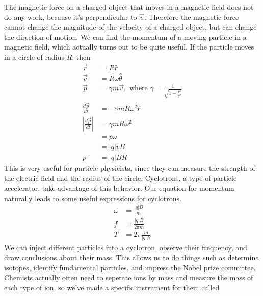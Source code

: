 \documentclass[nobib]{tufte-handout}
\begin{document}
The magnetic force on a charged object that moves in a
magnetic field does not do any work, because it's
perpendicular to $\vec{v}$.
Therefore the magnetic force cannot change the magnitude of the
velocity of a charged object, but can change the direction
of motion. 
We can find the momentum of a moving particle in a magnetic field, which actually turns 
out to be quite useful. If the particle moves in a circle of radius $R$, then 
\begin{align*}
    \vec{r} &= R\hat{r} \\
    \vec{v} &= R\omega\hat{\theta} \\
    \vec{p} &= \gamma m \vec{v}, \text{ where } \gamma = \frac{1}{\sqrt{1-\frac{v^2}{c^2}}} \\
    \frac{d\vec{p}}{dt} &= -\gamma mR\omega^2\hat{r} \\
    |\frac{d\vec{p}}{dt}| &= \gamma mR\omega^2 \\
    &= p\omega \\
    &= |q|vB \\
    p &= |q|BR
\end{align*}
This is very useful for particle physicists, 
since they can measure the strength of the 
electric field and the radius of the circle. 
Cyclotrons, a type of particle accelerator, 
take advantage of this behavior. Our equation for 
momentum naturally leads to some useful 
expressions for cyclotrons. 
\begin{align*}
    \omega &= \frac{|q|B}{m} \\
    f &= \frac{|q|B}{2\pi m} \\
    T &= 2\pi \frac{m}{|q|B}
\end{align*}
We can inject different particles into 
a cyclotron, observe their frequency, and 
draw conclusions about their mass. 
This allows us to do things such as 
determine isotopes, identify fundamental 
particles, and impress the Nobel prize committee. 
Chemists actually often need to seperate ions 
by mass and measure the mass of each type of ion, 
so we've made a specific instrument for them called 
\end{document}
